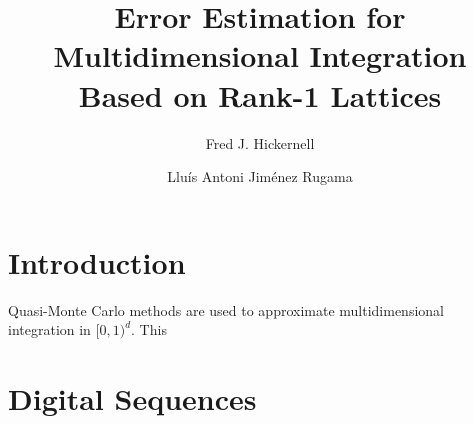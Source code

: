\documentclass[graybox,footinfo]{svmult}
\newcommand{\N}{\mathbb{N}} %
\newcommand{\bsz}{\boldsymbol{z}}    %
\begin{document}
\newcommand{\bsi}{\boldsymbol{i}}    %
\newcommand{\bsk}{\boldsymbol{k}}    %
\newcommand{\bsl}{\boldsymbol{l}}    %
\newcommand{\bsr}{\boldsymbol{r}}    %
\newcommand{\bsnu}{\boldsymbol{\nu}}    %
\newcommand{\cc}{\mathcal{C}}
\newcommand{\cl}{\mathcal{L}}
\newcommand{\cn}{\mathcal{N}}
\newcommand{\Order}{\mathcal{O}}
\newcommand{\cp}{\mathcal{P}}
\newcommand{\cx}{\mathcal{X}}
\newcommand{\natm}{\N_{0,m}}
\newcommand{\cube}{[0,1)^d}
\newcommand{\hf}{\hat{f}}
\newcommand{\rf}{\mathring{f}}
\newcommand{\tf}{\tilde{f}}
\newcommand{\hg}{\hat{g}}
\newcommand{\hI}{\hat{I}}
\newcommand{\tvk}{\tilde{\bsk}}
\newcommand{\hS}{\widehat{S}}
\newcommand{\tS}{\widetilde{S}}
\newcommand{\wcS}{\widecheck{S}}
\newcommand{\rnu}{\mathring{\nu}}
\newcommand{\tnu}{\widetilde{\nu}}
\newcommand{\hnu}{\widehat{\nu}}
\newcommand{\homega}{\widehat{\omega}}
\newcommand{\wcomega}{\mathring{\omega}}
\newcommand{\fC}{\mathfrak{C}}
\newcommand{\nodes}{\{\bsz_i\}_{i=0}^{\infty}}
\newcommand{\nodesn}{\{\bsz_i\}_{i=0}^{n-1}}
\newcommand{\norm}[1]{\ensuremath{\left \lVert #1 \right \rVert}} \newcommand{\bigabs}[1]{\ensuremath{\bigl \lvert #1 \bigr \rvert}}
\newcommand{\Bigabs}[1]{\ensuremath{\Bigl \lvert #1 \Bigr \rvert}}
\newcommand{\biggabs}[1]{\ensuremath{\biggl \lvert #1 \biggr \rvert}}
\newcommand{\Biggabs}[1]{\ensuremath{\Biggl \lvert #1 \Biggr \rvert}}
\newcommand{\ip}[3][{}]{\ensuremath{\left \langle #2, #3 \right \rangle_{#1}}}



\title*{Error Estimation for Multidimensional Integration Based on Rank-1 Lattices}
\author{Fred J. Hickernell \and Llu\'is Antoni Jim\'enez Rugama}
\maketitle

\abstract{}

\section{Introduction}
Quasi-Monte Carlo methods are used to approximate multidimensional integration in $\cube$. This 
\section{Digital Sequences}
\end{document}
